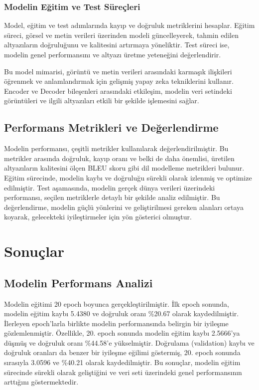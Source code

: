 \documentclass{article}
\begin{document}
\subsubsection{Modelin Eğitim ve Test Süreçleri}
Model, eğitim ve test adımlarında kayıp ve doğruluk metriklerini hesaplar. Eğitim süreci, görsel ve metin verileri üzerinden modeli güncelleyerek, tahmin edilen altyazıların doğruluğunu ve kalitesini artırmaya yöneliktir. Test süreci ise, modelin genel performansını ve altyazı üretme yeteneğini değerlendirir.

Bu model mimarisi, görüntü ve metin verileri arasındaki karmaşık ilişkileri öğrenmek ve anlamlandırmak için gelişmiş yapay zeka tekniklerini kullanır. Encoder ve Decoder bileşenleri arasındaki etkileşim, modelin veri setindeki görüntüleri ve ilgili altyazıları etkili bir şekilde işlemesini sağlar.
\subsection{Performans Metrikleri ve Değerlendirme}
Modelin performansı, çeşitli metrikler kullanılarak değerlendirilmiştir. Bu metrikler arasında doğruluk, kayıp oranı ve belki de daha önemlisi, üretilen altyazıların kalitesini ölçen BLEU skoru gibi dil modelleme metrikleri bulunur. Eğitim sürecinde, modelin kaybı ve doğruluğu sürekli olarak izlenmiş ve optimize edilmiştir. Test aşamasında, modelin gerçek dünya verileri üzerindeki performansı, seçilen metriklerle detaylı bir şekilde analiz edilmiştir. Bu değerlendirme, modelin güçlü yönlerini ve geliştirilmesi gereken alanları ortaya koyarak, gelecekteki iyileştirmeler için yön gösterici olmuştur.



\section{Sonuçlar}

\subsection{Modelin Performans Analizi}
Modelin eğitimi 20 epoch boyunca gerçekleştirilmiştir. İlk epoch sonunda, modelin eğitim kaybı 5.4380 ve doğruluk oranı \%20.67 olarak kaydedilmiştir. İlerleyen epoch'larla birlikte modelin performansında belirgin bir iyileşme gözlemlenmiştir. Özellikle, 20. epoch sonunda modelin eğitim kaybı 2.5666'ya düşmüş ve doğruluk oranı \%44.58'e yükselmiştir. Doğrulama (validation) kaybı ve doğruluk oranları da benzer bir iyileşme eğilimi göstermiş, 20. epoch sonunda sırasıyla 3.0596 ve \%40.21 olarak kaydedilmiştir. Bu sonuçlar, modelin eğitim sürecinde sürekli olarak geliştiğini ve veri seti üzerindeki genel performansının arttığını göstermektedir.
\end{document}
